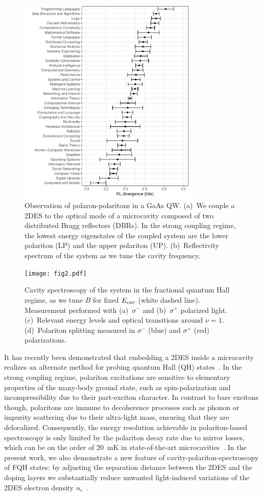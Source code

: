 \documentclass[prl,twocolumn,10pt,showpacs,superscriptaddress,longbibliography,footnoteinbib]{revtex4-1}
\begin{document}
\begin{figure}
\centering
\includegraphics[width=86mm]{fig1.pdf}
\caption{Observation of polaron-polaritons in a GaAs QW. (a)~We couple a 2DES to the optical mode of a microcavity composed of two distributed Bragg reflectors (DBRs). In the strong coupling regime, the lowest energy eigenstates of the coupled system are the lower polariton (LP) and the upper polariton (UP). (b)~Reflectivity spectrum of the system as we tune the cavity frequency.}
\label{fig:Spectroscopy}
\end{figure}

\begin{figure}
\centering
\texttt{[image: fig2.pdf]}
\caption{Cavity spectroscopy of the system in the fractional quantum Hall regime, as we tune $B$ for fixed $E_{\rm cav}$ (white dashed line). Measurement performed with (a)~$\sigma^-$ and (b)~$\sigma^+$ polarized light. (c)~Relevant energy levels and optical transitions around $\nu=1$. (d)~Polariton splitting measured in $\sigma^-$ (blue) and $\sigma^+$ (red) polarizations.}
\label{fig:IQHE}
\end{figure}

It has recently been demonstrated that embedding a 2DES inside a microcavity realizes an alternate method for probing quantum Hall (QH) states~\cite{Smolka2014}. In the strong coupling regime, polariton excitations are sensitive to elementary properties of the many-body ground state, such as spin-polarization and incompressibility due to their part-exciton character. In contrast to bare excitons though, polaritons are immune to decoherence processes such as phonon or impurity scattering due to their ultra-light mass, ensuring that they are delocalized. Consequently, the energy resolution achievable in polariton-based spectroscopy is only limited by the polariton decay rate due to mirror losses, which can be on the order of 20~mK in state-of-the-art microcavities~\cite{Steger2013}. In the present work, we also demonstrate a new feature of cavity-polariton-spectroscopy of FQH states: by adjusting the separation distance between the 2DES and the doping layers we substantially reduce unwanted light-induced variations of the 2DES electron density $n_e$~\cite{Supplemental}.
\end{document}
